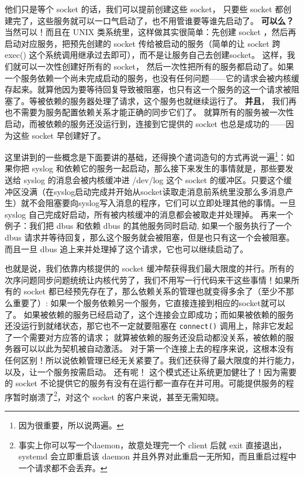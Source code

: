 \begin{insertnote}
他们只是等个 socket 的话，我们可以提前创建这些 socket， 只要些 socket 都创建完了，这些服务就可以一口气启动了，也不用管谁要等谁先启动了。
\textbf{可以么？} 当然可以！而且在 UNIX 类系统里，这样做其实很简单：先创建 socket ，然后再启动对应服务，把预先创建的 socket 传给被启动的服务（简单的让 socket 跨 exec() 这个系统调用继承过去即可），而不是让服务自己去创建socket。
这样，我们就可以一次性创建好所有的 socket， 然后一次性把所有的服务都启动了。如果一个服务依赖一个尚未完成启动的服务，也没有任何问题——它的请求会被内核缓存起来。就算他因为要等待回复导致被阻塞，也只有这一个服务的这一个请求被阻塞了。等被依赖的服务器处理了请求，这个服务也就继续运行了。
\textbf{并且}， 我们再也不需要为服务配置依赖关系才能正确的同步它们了。
就算所有的服务被一次性启动，而被依赖的服务还没运行到，连接到它提供的 socket 也总是成功的——因为这些 socket 早创建好了。

这里讲到的一些概念是下面要讲的基础，还得换个遣词造句的方式再说一遍\footnote{因为很重要，所以说两遍。}：如果你把 syslog 和依赖它的服务一起启动，那么接下来发生的事情就是，那些要发送给 syslog 的消息会被内核缓冲进 /dev/log 这个 socket 的缓冲区。只要这个缓冲区没满（在syslog启动完成并开始从socket读取走消息前系统里没那么多消息产生）就不会阻塞要向syslog写入消息的程序，它们可以立即处理其他的事情。一旦 syslog 自己完成好启动，所有被内核缓冲的消息都会被取走并处理掉。
再来一个例子：我们把 dbus 和依赖 dbus 的其他服务同时启动, 如果一个服务执行了一个 dbus 请求并等待回复，那么这个服务就会被阻塞，但是也只有这一个会被阻塞。而且一旦 dbus 追上来并处理掉了这个请求，它也可以继续启动了。

也就是说，我们依靠内核提供的 socket 缓冲帮获得我们最大限度的并行。所有的次序问题同步问题统统让内核代劳了，我们不用写一行代码来干这些事情！如果所有的 socket 都已经预先存在了，那么依赖关系的管理也就变得多余了（至少不那么重要了）: 如果一个服务依赖另一个服务，它直接连接到相应的socket就可以了。
如果被依赖的服务已经启动了，这个连接会立即成功；而如果被依赖的服务还没运行到就绪状态，那它也不一定就要阻塞在 \texttt{connect()} 调用上，除非它发起了一个需要对方应答的请求；
就算被依赖的服务还没启动都没关系，被依赖的服务器可以以此为契机被自动激活。
对于第一个连接上去的程序来说，这根本没有任何区别！所以说依赖管理已经无关紧要了。我们还获得了最大限度的并行能力，以及，让一个服务按需启动。
还有呢！ 这个模式还让系统更加健壮了！因为需要的 socket 不论提供它的服务有没有在运行都一直存在并可用。可能提供服务的程序暂时崩溃了\footnote{事实上你可以写一个daemon，故意处理完一个 client 后就 exit 直接退出，systemd 会立即重启该 daemon 并且外界对此重启一无所知，而且重启过程中一个请求都不会丢弃。}，对这个 socket 的客户来说，甚至无需知晓。


\end{insertnote}
